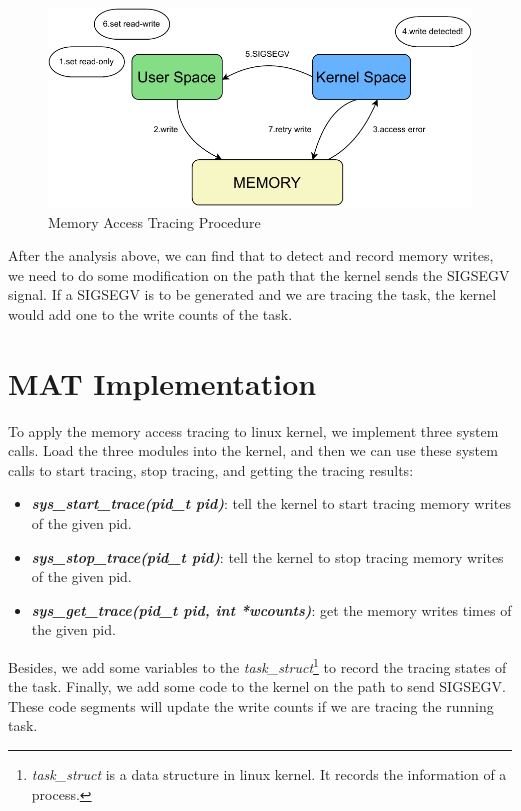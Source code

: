 \begin{figure}[!htp]
  \centering
  \includegraphics[width=12cm]{figures/memaccess.drawio.pdf}
  \caption{Memory Access Tracing Procedure}
\end{figure}

After the analysis above, we can find that to detect and record memory writes, we need to do some modification on the path that the kernel sends the SIGSEGV signal. If a SIGSEGV is to be generated and we are tracing the task, the kernel would add one to the write counts of the task.

\section{MAT Implementation}

To apply the memory access tracing to linux kernel, we implement three system calls. Load the three modules into the kernel, and then we can use these system calls to start tracing, stop tracing, and getting the tracing results:

\begin{itemize}
    \item \textbf{\textit{sys\_start\_trace(pid\_t pid)}}: tell the kernel to start tracing memory writes of the given pid.
    \item \textbf{\textit{sys\_stop\_trace(pid\_t pid)}}: tell the kernel to stop tracing memory writes of the given pid.
    \item \textbf{\textit{sys\_get\_trace(pid\_t pid, int *wcounts)}}: get the memory writes times of the given pid.
\end{itemize}

Besides, we add some variables to the \textit{task\_struct}\footnote{\textit{task\_struct} is a data structure in linux kernel. It records the information of a process.} to record the tracing states of the task. Finally, we add some code to the kernel on the path to send SIGSEGV. These code segments will update the write counts if we are tracing the running task.

